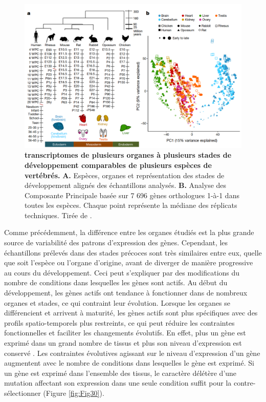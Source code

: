 \begin{figure}[h]
 \centering
 \includegraphics[width=1\textwidth, page=1] {figures/introduction/fig29.png}
 \caption[\glspl{transcriptome} de plusieurs organes à plusieurs stades de développement comparables de plusieurs espèces de vertébrés.]{
 \textbf{\glspl{transcriptome} de plusieurs organes à plusieurs stades de développement comparables de plusieurs espèces de vertébrés.}
 \textbf{A.} Espèces, organes et représentation des stades de développement alignés des échantillons analysés. \textbf{B.} Analyse des Composante Principale basée sur 7 696 gènes orthologues 1-à-1 dans toutes les espèces. Chaque point représente la médiane des réplicats techniques. Tirée de \citet{cardoso-moreira_gene_2019}.\\
 }
 \label{fig:Fig29}
\end{figure}

Comme précédemment, la différence entre les organes étudiés est la plus grande source de variabilité des patrons d’expression des gènes. Cependant, les échantillons prélevés dans des stades précoces sont très similaires entre eux, quelle que soit l’espèce ou l’organe d’origine, avant de diverger de manière progressive au cours du développement. Ceci peut s’expliquer par des modifications du nombre de \glspl{condition} dans lesquelles les gènes sont actifs. Au début du développement, les gènes actifs ont tendance à fonctionner dans de nombreux organes et stades, ce qui contraint leur évolution. Lorsque les organes se différencient et arrivent à maturité, les gènes actifs sont plus spécifiques avec des profils spatio-temporels plus restreints, ce qui peut réduire les contraintes fonctionnelles et faciliter les changements évolutifs. En effet, plus un gène est exprimé dans un grand nombre de tissus et plus son niveau d’expression est conservé \citep{khaitovich_evolution_2006}. Les contraintes évolutives agissant sur le niveau d’expression d’un gène augmentent avec le nombre de \glspl{condition} dans lesquelles le gène est exprimé. Si un gène est exprimé dans l’ensemble des tissus, le caractère délétère d’une mutation affectant son expression dans une seule \gls{condition} suffit pour la contre-sélectionner (Figure \ref{fig:Fig30}).

